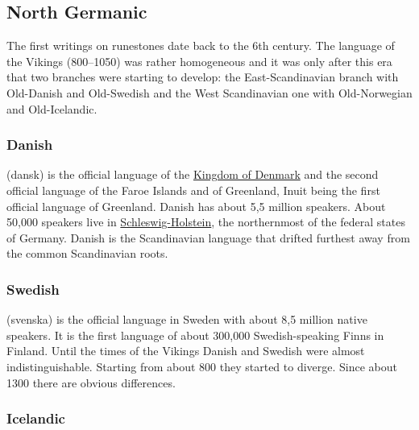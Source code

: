 \subsection{North Germanic}

The first writings on runestones date back to the 6th century. The language of the Vikings
(800--1050) was rather homogeneous and it was only after this era that two branches were starting to
develop: the East-Scandinavian branch with Old-Danish and Old-Swedish and the West Scandinavian one
with Old-Norwegian and Old-Icelandic.


\subsubsection{Danish}

 (dansk) is the official language of the
\href{https://en.wikipedia.org/wiki/Denmark}{Kingdom of Denmark} and the second official language of the
Faroe Islands and of Greenland, Inuit being the first official language of
Greenland. Danish has about 5,5 million speakers. About 50,000 speakers live in \href{https://en.wikipedia.org/wiki/Schleswig-Holstein}{Schleswig-Holstein}, the northernmost of the federal states of Germany.
Danish is the Scandinavian language that drifted furthest away from the common Scandinavian roots.


\subsubsection{Swedish}

 (svenska) is the official language in Sweden with about 8,5 million native speakers. It is
the first language of about 300,000 Swedish-speaking Finns in Finland. Until the times of the
Vikings Danish and Swedish were almost indistinguishable. Starting from about 800 they started to
diverge. Since about 1300 there are obvious differences.



\subsubsection{Icelandic}


